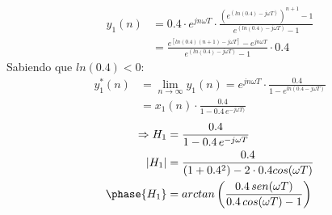 \documentclass[../../guia1.tex]{subfiles}
\begin{document}
\begin{align*}
	y_1(n) &= 0.4\cdot e^{jn\omega T}\cdot \frac{\left({e^{(ln(0.4)-j\omega T)}}\right)^{n+1}-1}{e^{(ln(0.4)-j\omega T)}-1}\\
		&= \frac{e^{[ln(0.4)(n+1)-j\omega T]} - e^{jn\omega T}}{e^{(ln(0.4)-j\omega T)}-1}\cdot 0.4
\end{align*}
Sabiendo que $ln(0.4) < 0$:
\begin{align*}
	y_1^*(n) &= \lim_{n\rightarrow \infty} y_1(n) = e^{jn\omega T}\cdot \frac{0.4}{1-e^{ln(0.4 - j\omega T)}}\\
			&= x_1(n)\cdot  \frac{0.4}{1-0.4 \,e^{- j\omega T)}}
\end{align*}
\begin{align*}
	\Rightarrow H_1 &= \frac{0.4}{1-0.4\,e^{-j\omega T}}\\
	|H_1| &= \frac{0.4}{(1+0.4^2)-2\cdot 0.4 cos(\omega T)}\\
	\phase{H_1} &= arctan\left( \frac{0.4\, sen(\omega T)}{0.4\, cos(\omega T) - 1} \right)
\end{align*}
\end{document}
